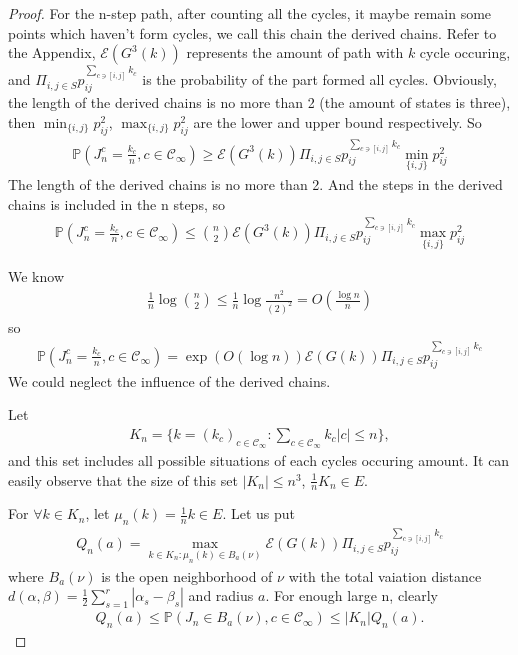 \documentclass[11pt,en,cite=authoryear]{elegantpaper}
\begin{document}
\begin{proof}
    For the n-step path, after counting all the cycles, it maybe remain some points which haven't form cycles, we call this chain the derived chains.
    Refer to the Appendix, $\mathcal{E} (G^3(k))$ represents the amount of path with $k$ cycle occuring, and $\Pi_{i,j \in S} p_{ij}^{\sum_{c \ni [i,j]} k_{c}} $ is the probability of the part formed all cycles. Obviously, the length of the derived chains is no more than 2 (the amount of states is three), then
    $\min_{\{i, j\}} p_{ij}^{2}$, $\max_{\{i, j\}} p_{ij}^2$ are the lower and upper bound respectively. So
    \begin{align*}
        \mathbb{P}(J_{n}^c= \frac{k_c}{n}, c \in \mathcal{C}_{\infty}) 
        \ge \mathcal{E} (G^3(k)) \Pi_{i,j \in S} p_{ij}^{\sum_{c \ni [i,j]} k_{c}}
        \min_{\{i, j\}} p_{ij}^{2}
    \end{align*}
    The length of the derived chains is no more than 2. And the steps in the derived chains is included in the n steps, so
    \begin{align*}
        \mathbb{P}(J_{n}^c = \frac{k_c}{n}, c \in \mathcal{C}_{\infty}) 
        \le \binom{n}{2}
        \mathcal{E} (G^3(k)) \Pi_{i,j \in S} p_{ij}^{\sum_{c \ni [i,j]} k_{c}}
        \max_{\{i, j\}} p_{ij}^2
    \end{align*}

    We know
    \begin{align*}
        \frac{1}{n} \log \binom{n}{2} \le \frac{1}{n} \log \frac{n^2}{(2)^{2}}
        = O(\frac{\log n}{n})
    \end{align*}
    so 
    \begin{align*}
        \mathbb{P}(J_{n}^c = \frac{k_c}{n}, c \in \mathcal{C}_{\infty}) 
        = \exp(O (\log n))
        \mathcal{E} (G(k)) \Pi_{i,j \in S} p_{ij}^{\sum_{c \ni [i,j]} k_{c}}
    \end{align*}
    We could neglect the influence of the derived chains.

    Let
    \begin{align*}
        K_n = \biggl\{k=(k_c)_{c\in \mathcal{C}_{\infty}}: \sum_{c \in \mathcal{C}_{\infty}} k_{c} |c| \le n \biggr\},
    \end{align*}
    and this set includes all possible situations of each cycles occuring amount. It can easily observe that the size of this set $|K_n| \le n^3$, $\frac{1}{n} K_n \in E$. 

    For $\forall k \in K_n$, let $\mu_n(k) = \frac{1}{n} k \in E$. Let us put
    \begin{align*}
        Q_n(a) = \max_{k\in K_n: \mu_n(k) \in B_a(\nu)} 
        \mathcal{E} (G(k)) \Pi_{i,j \in S} p_{ij}^{\sum_{c \ni [i,j]} k_{c}}
    \end{align*}
    where $B_a(\nu)$ is the open neighborhood of $\nu$ with the total vaiation distance
    $ d(\alpha, \beta) = \frac{1}{2} \sum_{s=1}^r |\alpha_s - \beta_s| $ and radius $a$. 
    For enough large n, clearly
    \begin{align*}
        Q_n(a) 
        \le \mathbb{P}(J_{n} \in B_a(\nu), c \in \mathcal{C}_{\infty})
        \le |K_n| Q_n(a).
    \end{align*}


\end{proof}
\end{document}
